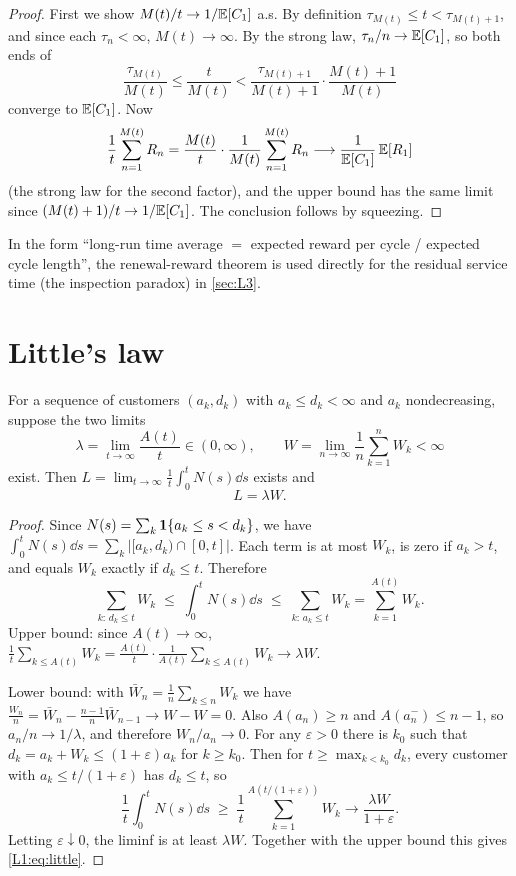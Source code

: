 \begin{proof}
First we show $M(t)/t\to1/\mathbb{E}[C_1]$ a.s. By definition $\tau_{M(t)}\le t<\tau_{M(t)+1}$,
and since each $\tau_n<\infty$, $M(t)\to\infty$. By the strong law,
$\tau_n/n\to\mathbb{E}[C_1]$, so both ends of
\[
  \frac{\tau_{M(t)}}{M(t)}\le\frac{t}{M(t)}<\frac{\tau_{M(t)+1}}{M(t)+1}\cdot\frac{M(t)+1}{M(t)}
\]
converge to $\mathbb{E}[C_1]$. Now
\[
  \frac{1}{t}\sum_{n=1}^{M(t)}R_n=\frac{M(t)}{t}\cdot\frac{1}{M(t)}\sum_{n=1}^{M(t)}R_n
  \longrightarrow\frac{1}{\mathbb{E}[C_1]}\,\mathbb{E}[R_1]
\]
(the strong law for the second factor), and the upper bound has the same limit since
$(M(t)+1)/t\to1/\mathbb{E}[C_1]$. The conclusion follows by squeezing.
\end{proof}

In the form ``long-run time average $=$ expected reward per cycle / expected cycle
length'', the renewal-reward theorem is used directly for the residual service time
(the inspection paradox) in \cref{sec:L3}.


\section{Little's law}

\begin{theorem}\label{thm:little}
For a sequence of customers $(a_k,d_k)$ with $a_k\le d_k<\infty$ and $a_k$
nondecreasing, suppose the two limits
\[
  \lambda=\lim_{t\to\infty}\frac{A(t)}{t}\in(0,\infty),\qquad
  W=\lim_{n\to\infty}\frac1n\sum_{k=1}^nW_k<\infty
\]
exist. Then $L=\lim_{t\to\infty}\frac1t\int_0^tN(s)\dd s$ exists and
\begin{equation}\label{L1:eq:little}
  L=\lambda W .
\end{equation}
\end{theorem}

\begin{proof}
Since $N(s)=\sum_k\mathbf{1}\{a_k\le s<d_k\}$, we have
$\int_0^tN(s)\dd s=\sum_k\bigl|[a_k,d_k)\cap[0,t]\bigr|$.
Each term is at most $W_k$, is zero if $a_k>t$, and equals $W_k$ exactly if
$d_k\le t$. Therefore
\begin{equation}\label{L1:eq:little-sandwich}
  \sum_{k:\,d_k\le t}W_k\;\le\;\int_0^tN(s)\dd s\;\le\;\sum_{k:\,a_k\le t}W_k=\sum_{k=1}^{A(t)}W_k .
\end{equation}
Upper bound: since $A(t)\to\infty$,
$\frac1t\sum_{k\le A(t)}W_k=\frac{A(t)}{t}\cdot\frac{1}{A(t)}\sum_{k\le A(t)}W_k\to\lambda W$.

Lower bound: with $\bar W_n=\frac1n\sum_{k\le n}W_k$ we have
$\frac{W_n}{n}=\bar W_n-\frac{n-1}{n}\bar W_{n-1}\to W-W=0$. Also $A(a_n)\ge n$ and
$A(a_n^-)\le n-1$, so $a_n/n\to1/\lambda$, and therefore $W_n/a_n\to0$.
For any $\varepsilon>0$ there is $k_0$ such that $d_k=a_k+W_k\le(1+\varepsilon)a_k$ for
$k\ge k_0$. Then for $t\ge\max_{k<k_0}d_k$, every customer with
$a_k\le t/(1+\varepsilon)$ has $d_k\le t$, so
\[
  \frac1t\int_0^tN(s)\dd s\;\ge\;\frac1t\sum_{k=1}^{A(t/(1+\varepsilon))}W_k
  \longrightarrow\frac{\lambda W}{1+\varepsilon}.
\]
Letting $\varepsilon\downarrow0$, the liminf is at least $\lambda W$. Together with
the upper bound this gives \eqref{L1:eq:little}.
\end{proof}

